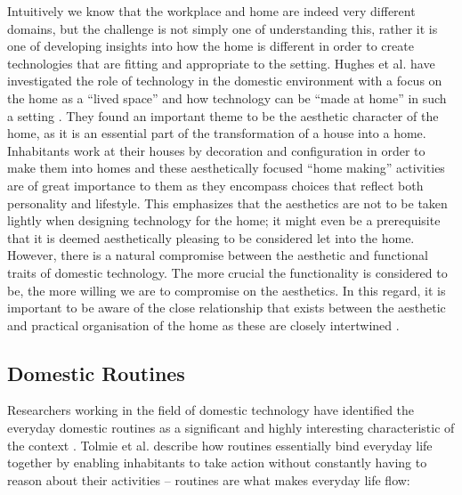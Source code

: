 Intuitively we know that the workplace and home are indeed very different domains, but the challenge is not simply one of understanding this, rather it is one of developing insights into how the home is different in order to create technologies that are fitting and appropriate to the setting. Hughes et al. have investigated the role of technology in the domestic environment with a focus on the home as a “lived space” and how technology can be “made at home” in such a setting \cite{hughes1998understanding}. They found an important theme to be the aesthetic character of the home, as it is an essential part of the transformation of a house into a home. Inhabitants work at their houses by decoration and configuration in order to make them into homes and these aesthetically focused “home making” activities are of great importance to them as they encompass choices that reflect both personality and lifestyle. This emphasizes that the aesthetics are not to be taken lightly when designing technology for the home; it might even be a prerequisite that it is deemed aesthetically pleasing to be considered let into the home. However, there is a natural compromise between the aesthetic and functional traits of domestic technology. The more crucial the functionality is considered to be, the more willing we are to compromise on the aesthetics. In this regard, it is important to be aware of the close relationship that exists between the aesthetic and practical organisation of the home as these are closely intertwined \cite{hughes1998understanding}.

\subsection{Domestic Routines}
Researchers working in the field of domestic technology have identified the everyday domestic routines as a significant and highly interesting characteristic of the context \cite{edwards2001home,crabtree2004domestic,tolmie2002unremarkable}. Tolmie et al. describe how routines essentially bind everyday life together by enabling inhabitants to take action without constantly having to reason about their activities \cite{tolmie2002unremarkable} -- routines are what makes everyday life flow:


